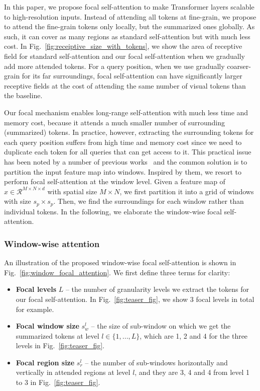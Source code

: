 \documentclass{article}
\begin{document}
In this paper, we propose focal self-attention to make Transformer layers scalable to high-resolution inputs. Instead of attending all tokens at fine-grain, we propose to attend the fine-grain tokens only locally, but the summarized ones globally. As such, it can cover as many regions as standard self-attention but with much less cost. In Fig.~\ref{fig:receiptive_size_with_tokens}, we show the area of receptive field for standard self-attention and our focal self-attention when we gradually add more attended tokens. For a query position, when we use gradually coarser-grain for its far surroundings, focal self-attention can have significantly larger receptive fields at the cost of attending the same number of visual tokens than the baseline. 

Our focal mechanism enables long-range self-attention with much less time and memory cost, because it attends a much smaller number of surrounding (summarized) tokens. In practice, however, extracting the surrounding tokens for each query position suffers from high time and memory cost since we need to duplicate each token for all queries that can get access to it. This practical issue has been noted by a number of previous works~\cite{vaswani2021scaling,zhang2021multi,liu2021swin} and the common solution is to partition the input feature map into windows. Inspired by them, we resort to perform focal self-attention at the window level. Given a feature map of $x \in \mathcal{R}^{M \times N \times d}$ with spatial size $M\times N$, we first partition it into a grid of windows with size $s_p \times s_p$. Then, we find the surroundings for each window rather than individual tokens. In the following, we elaborate the window-wise focal self-attention.

\subsubsection{Window-wise attention}

An illustration of the proposed window-wise focal self-attention is shown in Fig.~\ref{fig:window_focal_attention}. We first define three terms for clarity:
\begin{itemize}[noitemsep,topsep=0pt,leftmargin=*]
    \item \textbf{Focal levels} $L$ -- the number of granularity levels we extract the tokens for our focal self-attention. In Fig.~\ref{fig:teaser_fig}, we show 3 focal levels in total for example.
    \item \textbf{Focal window size} $s_w^l$ -- the size of sub-window on which we get the summarized tokens at level $l \in \{1,...,L\}$, which are 1, 2 and 4 for the three levels in Fig.~\ref{fig:teaser_fig}.
    \item \textbf{Focal region size} $s_r^l$ -- the number of sub-windows horizontally and vertically in attended regions at level $l$, and they are 3, 4 and 4 from level 1 to 3 in Fig.~\ref{fig:teaser_fig}.
\end{itemize}
\end{document}
